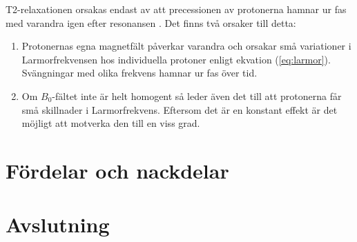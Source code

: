 \documentclass[11pt, a4paper]{article}
\begin{document}
T2-relaxationen orsakas endast av att precessionen av protonerna hamnar ur fas med varandra igen efter resonansen \parencite{understanding_mri}. Det finns två orsaker till detta:
\begin{enumerate}
	\item Protonernas egna magnetfält påverkar varandra och orsakar små variationer i Larmorfrekvensen hos individuella protoner enligt ekvation (\ref{eq:larmor}). Svängningar med olika frekvens hamnar ur fas över tid.
	\item Om $B_0$-fältet inte är helt homogent så leder även det till att protonerna får små skillnader i Larmorfrekvens. Eftersom det är en konstant effekt är det möjligt att motverka den till en viss grad.
\end{enumerate}

\clearpage
\section{Fördelar och nackdelar}


\clearpage
\section{Avslutning}

\clearpage
\printbibliography
\end{document}

